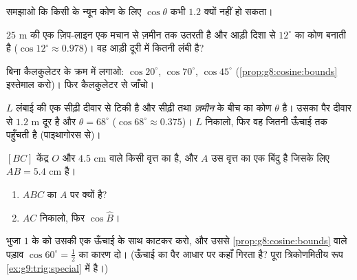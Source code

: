 \begin{exercise}[$\star$]\label{exo:g8:cosine:6}
समझाओ कि किसी  के न्यून कोण के लिए $\cos\theta$ कभी
$1.2$ क्यों नहीं हो सकता।
\end{exercise}

\begin{exercise}[$\star\star$]\label{exo:g8:cosine:7}
$25$ m की एक ज़िप-लाइन एक मचान से ज़मीन तक उतरती है और आड़ी दिशा से
$12^\circ$ का कोण बनाती है ($\cos 12^\circ \approx 0.978$)। वह आड़ी
दूरी में कितनी लंबी है?
\end{exercise}

\begin{exercise}[$\star\star$]\label{exo:g8:cosine:8}
बिना कैलकुलेटर के क्रम में लगाओ: $\cos 20^\circ$, $\cos 70^\circ$,
$\cos 45^\circ$ (\cref{prop:g8:cosine:bounds} इस्तेमाल करो)। फिर
कैलकुलेटर से जाँचो।
\end{exercise}

\begin{exercise}[$\star\star$]\label{exo:g8:cosine:9}
$L$ लंबाई की एक सीढ़ी दीवार से टिकी है और सीढ़ी तथा \emph{ज़मीन} के
बीच का कोण $\theta$ है। उसका पैर दीवार से $1.2$ m दूर है और
$\theta = 68^\circ$ ($\cos 68^\circ \approx 0.375$)। $L$ निकालो,
फिर वह जितनी ऊँचाई तक पहुँचती है (पाइथागोरस से)।
\end{exercise}

\begin{exercise}[$\star\star$]\label{exo:g8:cosine:10}
$[BC]$ केंद्र $O$ और  $4.5$ cm वाले किसी वृत्त का  है,
और $A$ उस वृत्त का एक बिंदु है जिसके लिए $AB = 5.4$ cm है।
\begin{enumerate}
  \item $ABC$ का $A$ पर  क्यों है?
  \item $AC$ निकालो, फिर $\cos \widehat B$।
\end{enumerate}
\end{exercise}

\begin{exercise}[$\star\star\star$]\label{exo:g8:cosine:11}
भुजा $1$ के  को उसकी एक ऊँचाई के साथ काटकर  करो,
और उससे \cref{prop:g8:cosine:bounds} वाले पड़ाव
$\cos 60^\circ = \frac12$ का कारण दो। (ऊँचाई का पैर आधार पर कहाँ
गिरता है? पूरा त्रिकोणमितीय रूप \cref{ex:g9:trig:special} में है।)
\end{exercise}

